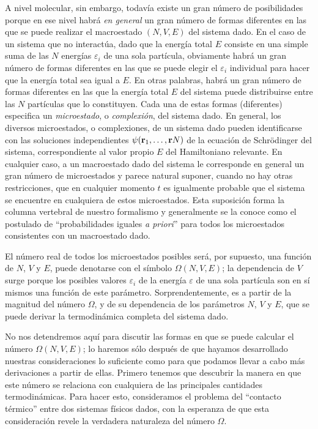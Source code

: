 \par
A nivel molecular, sin embargo, todavía existe un gran número de posibilidades porque en ese nivel habrá \emph{en general} un gran número de formas diferentes en las que se puede realizar el macroestado $(N, V, E)$ del sistema dado. En el caso de un sistema que no interactúa, dado que la energía total $E$ consiste en una simple suma de las $N$ energías $\varepsilon_{i}$ de una sola partícula, obviamente habrá un gran número de formas diferentes en las que se puede elegir el $\varepsilon_{i}$ individual para hacer que la energía total sea igual a $E$. En otras palabras, habrá un gran número de formas diferentes en las que la energía total $E$ del sistema puede distribuirse entre las $N$ partículas que lo constituyen. Cada una de estas formas (diferentes) especifica un \emph{microestado}, o \emph{complexión}, del sistema dado. En general, los diversos microestados, o complexiones, de un sistema dado pueden identificarse con las soluciones independientes $\psi (\vb{r}_{1}, \ldots, \vb{r}{N})$ de la ecuación de Schrödinger del sistema, correspondiente al valor propio $E$ del Hamiltoniano relevante. En cualquier caso, a un macroestado dado del sistema le corresponde en general un gran número de microestados y parece natural suponer, cuando no hay otras restricciones, que en cualquier momento $t$ es igualmente probable que el sistema se encuentre en cualquiera de estos microestados. Esta suposición forma la columna vertebral de nuestro formalismo y generalmente se la conoce como el postulado de \enquote{probabilidades iguales \emph{a priori}} para todos los microestados consistentes con un macroestado dado.
\par
El número real de todos los microestados posibles será, por supuesto, una función de $N$, $V$ y $E$, puede denotarse con el símbolo $\Omega (N, V, E)$; la dependencia de $V$ surge porque los posibles valores $\varepsilon_{i}$ de la energía $\varepsilon$ de una sola partícula son en sí mismos una función de este parámetro. Sorprendentemente, es a partir de la magnitud del número $\Omega$, y de su dependencia de los parámetros $N$, $V$ y $E$, que se puede derivar la termodinámica completa del sistema dado.
\par
No nos detendremos aquí para discutir las formas en que se puede calcular el número $\Omega (N, V, E)$; lo haremos sólo después de que hayamos desarrollado nuestras consideraciones lo suficiente como para que podamos llevar a cabo más derivaciones a partir de ellas. Primero tenemos que descubrir la manera en que este número se relaciona con cualquiera de las principales cantidades termodinámicas. Para hacer esto, consideramos el problema del \enquote{contacto térmico} entre dos sistemas físicos dados, con la esperanza de que esta consideración revele la verdadera naturaleza del número $\Omega$.


